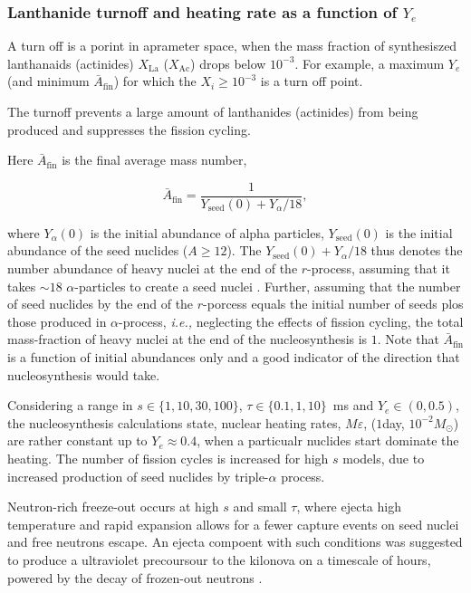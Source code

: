 \documentclass[11pt,a4paper,headinclude=true,DIV=14,BCOR=8mm,chapterprefix,listof=totoc,twoside,openright,abstracton]{scrbook}
\begin{document}
\subsubsection{Lanthanide turnoff and heating rate as a function of $Y_e$}

A turn off is a porint in aprameter space, when the mass fraction of synthesiszed lanthanaids (actinides) $X_{\text{La}}$ ($X_{\text{Ac}}$) drops below $10^{-3}$. For example, a maximum $Y_e$ (and minimum $\bar{A}_{\text{fin}}$) for which the $X_i \geq 10^{-3}$ is a turn off point. 

The turnoff prevents a large amount of lanthanides (actinides) from being produced and suppresses the fission cycling.

Here $\bar{A}_{\text{fin}}$ is the final average mass number,

\begin{equation}
    \bar{A}_{\text{fin}} = \frac{1}{Y_{\text{seed}}(0) + Y_{\alpha}/18},
\end{equation}

where $Y_{\alpha}(0)$ is the initial abundance of alpha particles, $Y_{\text{seed}}(0)$ is the initial abundance of the seed nuclides ($A\geq12$). The $Y_{\text{seed}}(0) + Y_{\alpha}/18$ thus denotes the number abundance of heavy nuclei at the end of the $r$-process, assuming that it takes $\sim 18$ $\alpha$-particles to create a seed nuclei \cite{Woosley and Hoffman, 1992}. Further, assuming that the number of seed nuclides by the end of the $r$-porcess equals the initial number of seeds plos those produced in $\alpha$-process, \textit{i.e.,} neglecting the effects of fission cycling, the total mass-fraction of heavy nuclei at the end of the nucleosynthesis is $1$. Note that $\bar{A}_{\text{fin}}$ is a function of initial abundances only and a good indicator of the direction that nucleosynthesis would take. 

Considering a range in $s\in\{1, 10, 30, 100 \}$, $\tau\in\{0.1, 1, 10\}$~ms and $Y_e\in(0,0.5)$,
the nucleosynthesis calculations state, nuclear heating rates, $M\varepsilon$, ($1$day, $10^{-2}M_{\odot}$) are rather constant up to $Y_e\approx 0.4$, when a particualr nuclides start dominate the heating. The number of fission cycles is increased for high $s$ models, due to increased production of seed nuclides by triple-$\alpha$ process. 

Neutron-rich freeze-out occurs at high $s$ and small $\tau$, where ejecta high temperature and rapid expansion allows for a fewer capture events on seed nuclei and free neutrons escape. An ejecta compoent with such conditions was suggested to produce a ultraviolet precoursour to the kilonova on a timescale of hours, powered by the decay of frozen-out neutrons \cite{Metzger et al. (2015)}.
\end{document}
